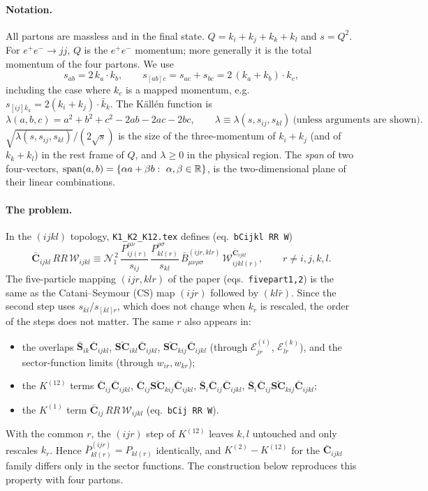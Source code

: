 \documentclass[11pt,a4paper]{article}
\newcommand{\bbC}[1]{\bar{\mathbf C}_{#1}}
\newcommand{\bbS}[1]{\bar{\mathbf S}_{#1}}
\newcommand{\bbSC}[1]{\bar{\mathbf{SC}}_{#1}}
\newcommand{\RR}{RR}
\newcommand{\W}[1]{\mathcal W_{#1}}
\newcommand{\kb}{\bar k_{k}}
\newcommand{\E}[3]{\mathcal E^{(#1)}_{#2#3}}
\newcommand{\Norms}{\mathcal N_1^{\,2}}
\begin{document}
\paragraph{Notation.}
All partons are massless and in the final state. $Q=k_i+k_j+k_k+k_l$ and $s=Q^2$.
For $e^+e^-\to jj$, $Q$ is the $e^+e^-$ momentum; more generally it is the total
momentum of the four partons. We use
\begin{equation}
s_{ab}=2\,k_a\!\cdot k_b,\qquad
s_{[ab]c}=s_{ac}+s_{bc}=2\,(k_a+k_b)\!\cdot k_c,
\end{equation}
including the case where $k_c$ is a mapped momentum, e.g.\ $s_{[ij]\kb}=2(k_i+k_j)\cdot\kb$.
The Källén function is
\begin{equation}
\lambda(a,b,c)=a^2+b^2+c^2-2ab-2ac-2bc ,
\qquad
\lambda\equiv\lambda(s,s_{ij},s_{kl}) \ \text{(unless arguments are shown)}.
\end{equation}
$\sqrt{\lambda(s,s_{ij},s_{kl})}/(2\sqrt s)$ is the size of the three-momentum of $k_i+k_j$
(and of $k_k+k_l$) in the rest frame of $Q$, and $\lambda\ge0$ in the physical region.
The \emph{span} of two four-vectors, ${\rm span}(a,b)=\{\alpha a+\beta b:\ \alpha,\beta\in\mathbb R\}$,
is the two-dimensional plane of their linear combinations.

\paragraph{The problem.}
In the $(ijkl)$ topology, \texttt{K1\_K2\_K12.tex} defines (eq.~\texttt{bCijkl RR W})
\begin{equation}
\bbC{ijkl}\,\RR\,\W{ijkl}
\equiv
\Norms\,\frac{P^{\mu\nu}_{ij(r)}}{s_{ij}}\,\frac{P^{\rho\sigma}_{kl(r)}}{s_{kl}}\,
\bar B^{(ijr,klr)}_{\mu\nu\rho\sigma}\,\W{ijkl(r)}^{\bbC{ijkl}},
\qquad r\neq i,j,k,l.
\label{eq:paper}
\end{equation}
The five-particle mapping $(ijr,klr)$ of the paper (eqs.~\texttt{fivepart1,2}) is the same as
the Catani--Seymour (CS) map $(ijr)$ followed by $(kl\bar r)$. Since the second step uses
$s_{kl}/s_{[kl]r}$, which does not change when $k_r$ is rescaled, the order of the steps does
not matter. The same $r$ also appears in:
\begin{itemize}
\item the overlaps $\bbS{ik}\bbC{ijkl}$, $\bbSC{ikl}\bbC{ijkl}$, $\bbSC{kij}\bbC{ijkl}$ (through
$\E{i}{j}{r}$, $\E{k}{l}{r}$), and the sector-function limits (through $w_{ir},w_{kr}$);
\item the $K^{(12)}$ terms $\bbC{ij}\bbC{ijkl}$, $\bbC{ij}\bbSC{kij}\bbC{ijkl}$,
$\bbS{i}\bbC{ij}\bbC{ijkl}$, $\bbS{i}\bbC{ij}\bbSC{kij}\bbC{ijkl}$;
\item the $K^{(1)}$ term $\bbC{ij}\,\RR\,\W{ijkl}$ (eq.~\texttt{bCij RR W}).
\end{itemize}
With the common $r$, the $(ijr)$ step of $K^{(12)}$ leaves $k,l$ untouched and only rescales $k_r$.
Hence $\bar P^{(ijr)}_{kl(r)}=P_{kl(r)}$ identically, and $K^{(2)}-K^{(12)}$ for the $\bbC{ijkl}$ family
differs only in the sector functions. The construction below reproduces this property with
four partons.
\end{document}

